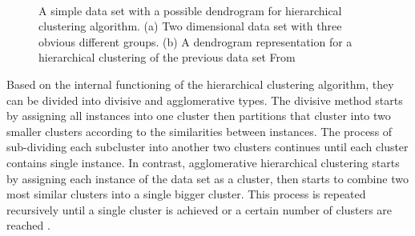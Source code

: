 \begin{figure}[!h]
    \hfill{\begin{minipage}{\dimexpr \textwidth-2\fboxsep-2\fboxrule}
            \centering
            \\
            
    \end{minipage}}
    \caption{A simple data set with a possible dendrogram for hierarchical clustering algorithm. 
        (a) Two dimensional data set with three obvious different groups.
        (b) A dendrogram representation for a hierarchical clustering of the previous data set
        From \cite{Jain1999}}
    \label{fig:Hira}
\end{figure}

Based on the internal functioning of the hierarchical clustering algorithm, they can be divided into divisive and agglomerative types. The divisive method starts by assigning all instances into one cluster then partitions that cluster into two smaller clusters according to the similarities between instances. The process of sub-dividing each subcluster into another two clusters continues until each cluster contains single instance. In contrast, agglomerative hierarchical clustering starts by assigning each instance of the data set as a cluster, then starts to combine two most similar clusters into a single bigger cluster. This process is repeated recursively until a single cluster is achieved or a certain number of clusters are reached \cite{Zaki2014}.

